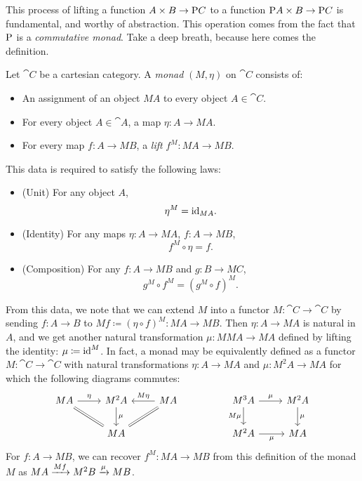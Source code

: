 \documentclass[DynamicalBook]{subfiles}
\begin{document}
This process of lifting a function $A \times B \to \mathrm{P} C$ to a function
$\mathrm{P} A \times B \to \mathrm{P} C$ is fundamental, and worthy of abstraction.
This operation comes from the fact that $\mathrm{P}$ is a \emph{commutative monad}. Take a deep breath, because here comes the definition.
\begin{definition}\label{def.commutative_monad}
Let $\cat{C}$ be a cartesian category. A \emph{monad} $(M, \eta)$ on $\cat{C}$ consists of:
\begin{itemize}
  \item An assignment of an object $MA$ to every object $A \in \cat{C}$.
  \item For every object $A \in \cat{A}$, a map $\eta : A \to MA$.
  \item For every map $f : A \to MB$, a \emph{lift} $f^M : MA \to MB$. 
\end{itemize}
This data is required to satisfy the following laws:
\begin{itemize}
  \item (Unit) For any object $A$, \[\eta^M = \mathrm{id}_{MA}.\]
  \item (Identity) For any maps $\eta : A \to MA$, $f : A \to MB$, \[f^M \circ \eta = f.\]
  \item (Composition) For any $f : A \to MB$ and $g : B \to MC$,
\[ g^M \circ f^M = (g^M \circ f)^M.\]
\end{itemize}
From this data, we note that we can extend $M$ into a functor $M : \cat{C} \to
\cat{C}$ by sending $f : A \to B$ to $Mf \coloneqq (\eta \circ f)^M : MA \to
MB$.
Then $\eta : A \to MA$ is natural in $A$, and we get another natural
transformation $\mu : MM A \to M A$ defined by lifting the identity: $\mu
\coloneqq \mathrm{id}^M$. In fact, a monad may be equivalently defined as a functor $M :
\cat{C} \to \cat{C}$ with natural transformations $\eta : A \to MA$ and $\mu :
M^2 A \to MA$ for which the following diagrams commutes:
\begin{equation}\label{eqn.monad_laws}
\begin{tikzcd}
MA \arrow[r, "\eta"] \arrow[rd, equals] & M^2A \arrow[d, "\mu"] & MA \arrow[l, "M\eta"'] \arrow[ld, equals] &  & M^3A \arrow[r, "\mu"] \arrow[d, "M\mu"'] & M^2 A \arrow[d, "\mu"] \\
                                & MA                                &                                   &  & M^2 A \arrow[r, "\mu"']                  & MA                    
\end{tikzcd}
\end{equation}
For $f : A \to M B$, we can recover $f^M : M A \to MB$ from this definition of
the monad $M$ as
$M A \xrightarrow{M f} M^2 B \xrightarrow{\mu} M B$.


\end{definition}
\end{document}
